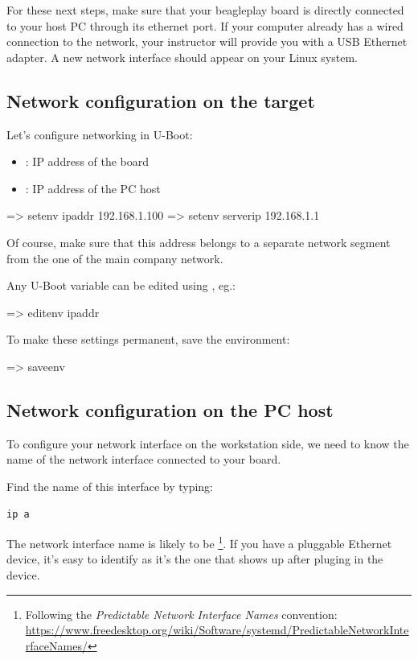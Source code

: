 For these next steps, make sure that your beagleplay board is directly connected
to your host PC through its ethernet port. If your computer already has a wired
connection to the network, your instructor will provide you with a USB Ethernet
adapter. A new network interface should appear on your Linux system.

\subsection{Network configuration on the target}

Let's configure networking in U-Boot:

\begin{itemize}
\item {}: IP address of the board
\item {}: IP address of the PC host
\end{itemize}

\begin{ubootinput}
=> setenv ipaddr 192.168.1.100
=> setenv serverip 192.168.1.1
\end{ubootinput}

Of course, make sure that this address belongs to a separate network
segment from the one of the main company network.

Any U-Boot variable can be edited using , eg.:

\begin{ubootinput}
=> editenv ipaddr
\end{ubootinput}

To make these settings permanent, save the environment:

\begin{ubootinput}
=> saveenv
\end{ubootinput}

\subsection{Network configuration on the PC host}

To configure your network interface on the workstation side, we need
to know the name of the network interface connected to your board.

Find the name of this interface by typing:

\begin{verbatim}
ip a
\end{verbatim}

The network interface name is likely to be
\footnote{Following the {\em Predictable Network Interface
Names} convention:
\url{https://www.freedesktop.org/wiki/Software/systemd/PredictableNetworkInterfaceNames/}}.
If you have a pluggable Ethernet device, it's easy to identify as it's
the one that shows up after pluging in the device.

